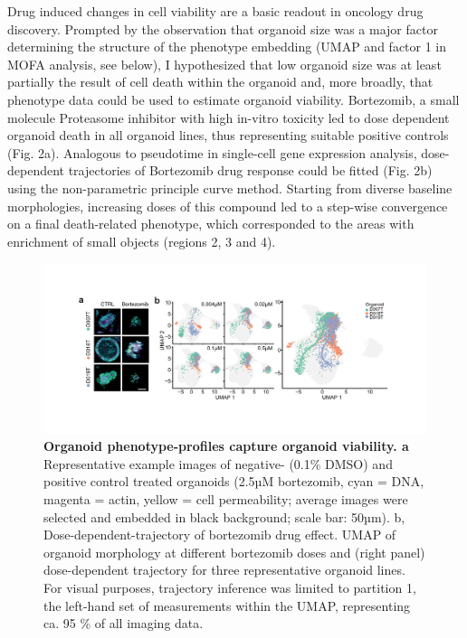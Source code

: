 \begin{flushleft}
Drug induced changes in cell viability are a basic readout in oncology drug discovery. Prompted by the observation that organoid size was a major factor determining the structure of the phenotype embedding (UMAP and factor 1 in MOFA analysis, see below), I hypothesized that low organoid size was at least partially the result of cell death within the organoid and, more broadly, that phenotype data could be used to estimate organoid viability. Bortezomib, a small molecule Proteasome inhibitor with high in-vitro toxicity led to dose dependent organoid death in all organoid lines, thus representing suitable positive controls (Fig. 2a). Analogous to pseudotime in single-cell  gene expression analysis, dose-dependent trajectories of Bortezomib drug response could be fitted (Fig. 2b) using the non-parametric principle curve method. Starting from diverse baseline morphologies, increasing doses of this compound led to a step-wise convergence on a final death-related phenotype, which corresponded to the areas with enrichment of small objects (regions 2, 3 and 4). 

\begin{figure}[h]
\centering
\includegraphics[width=\textwidth,
                height=\textheight,
                keepaspectratio]{figures/promise/pdf/fig_2_1.pdf}
\caption{\textbf{Organoid phenotype-profiles capture organoid viability. a} Representative example images of negative- (0.1\% DMSO) and positive control treated organoids (2.5µM bortezomib, cyan = DNA, magenta = actin, yellow = cell permeability; average images were selected and embedded in black background; scale bar: 50µm). b, Dose-dependent-trajectory of bortezomib drug effect. UMAP of organoid morphology at different bortezomib doses and (right panel) dose-dependent trajectory for three representative organoid lines. For visual purposes, trajectory inference was limited to partition 1, the left-hand set of measurements within the UMAP, representing ca. 95 \% of all imaging data.}
\label{fig_221}
\end{figure}
\bigbreak


\end{flushleft}
